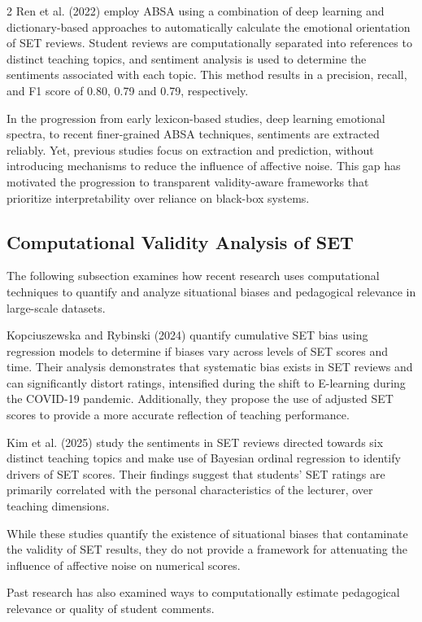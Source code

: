 \documentclass{article}
\begin{document}
\begin{multicols*}{2}
Ren et al. (2022) employ ABSA using a combination of deep learning and dictionary-based approaches to automatically calculate the emotional orientation of SET reviews. Student reviews are computationally separated into references to distinct teaching topics, and sentiment analysis is used to determine the sentiments associated with each topic. This method results in a precision, recall, and F1 score of 0.80, 0.79 and 0.79, respectively.

In the progression from early lexicon-based studies, deep learning emotional spectra, to recent finer-grained ABSA techniques, sentiments are extracted reliably. Yet, previous studies focus on extraction and prediction, without introducing mechanisms to reduce the influence of affective noise. This gap has motivated the progression to transparent validity-aware frameworks that prioritize interpretability over reliance on black-box systems.

\subsection{Computational Validity Analysis of SET}
The following subsection examines how recent research uses computational techniques to quantify and analyze situational biases and pedagogical relevance in large-scale datasets.

Kopciuszewska and Rybinski (2024) quantify cumulative SET bias using regression models to determine if biases vary across levels of SET scores and time. Their analysis demonstrates that systematic bias exists in SET reviews and can significantly distort ratings, intensified during the shift to E-learning during the COVID-19 pandemic. Additionally, they propose the use of adjusted SET scores to provide a more accurate reflection of teaching performance. 

Kim et al. (2025) study the sentiments in SET reviews directed towards six distinct teaching topics and make use of Bayesian ordinal regression to identify drivers of SET scores. Their findings suggest that students’ SET ratings are primarily correlated with the personal characteristics of the lecturer, over teaching dimensions.

While these studies quantify the existence of situational biases that contaminate the validity of SET results, they do not provide a framework for attenuating the influence of affective noise on numerical scores. 

Past research has also examined ways to computationally estimate pedagogical relevance or quality of student comments. 


\end{multicols*}
\end{document}
